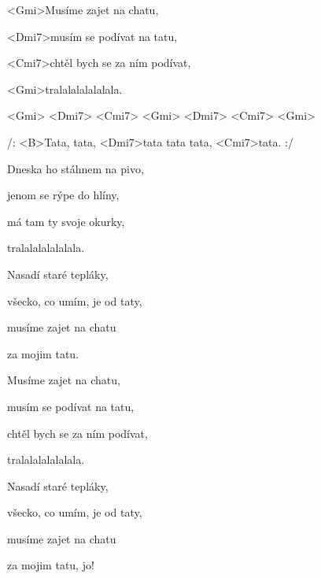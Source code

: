 
\zs
<Gmi>Musíme zajet na chatu,

<Dmi7>musím se podívat na tatu,

<Cmi7>chtěl bych se za ním podívat,

<Gmi>tralalalalalalala.

<Gmi> <Dmi7> <Cmi7> <Gmi> <Dmi7> <Cmi7> 
 <Gmi> 

\ks
\zr

/: <B>Tata, tata, <Dmi7>tata tata tata, <Cmi7>tata. :/

\kr
\zs
Dneska ho stáhnem na pivo,

jenom se rýpe do hlíny,

má tam ty svoje okurky,

tralalalalalalala.

\ks
\zs

Nasadí staré tepláky,

všecko, co umím, je od taty,

musíme zajet na chatu

za mojim tatu.

\ks
\zs

Musíme zajet na chatu,

musím se podívat na tatu,

chtěl bych se za ním podívat,

tralalalalalalala.

\ks
\zs

Nasadí staré tepláky,

všecko, co umím, je od taty,

musíme zajet na chatu

za mojim tatu, jo!

\ks
\zr

\kr
\kp
